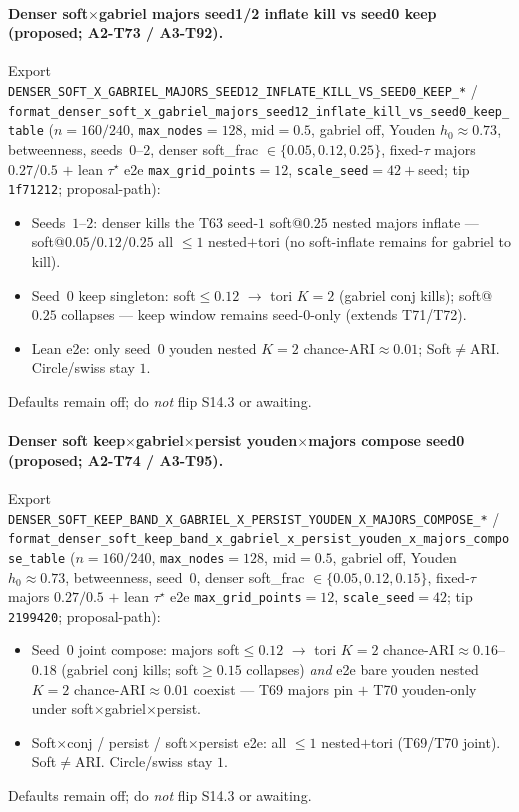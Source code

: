 \documentclass[11pt]{article}
\begin{document}
\paragraph{Denser soft$\times$gabriel majors seed1/2 inflate kill vs seed0
keep (proposed; A2-T73 / A3-T92).}
Export
\texttt{DENSER\_SOFT\_X\_GABRIEL\_MAJORS\_SEED12\_INFLATE\_KILL\_VS\_SEED0\_KEEP\_*} /
\texttt{format\_denser\_soft\_x\_gabriel\_majors\_seed12\_inflate\_kill\_vs\_seed0\_keep\_table}
($n{=}160/240$, \texttt{max\_nodes}${=}128$, mid${=}0.5$, gabriel off,
Youden $h_0\approx 0.73$, betweenness, seeds~$0$--$2$, denser soft\_frac
$\in\{0.05,0.12,0.25\}$, fixed-$\tau$ majors $0.27/0.5$ $+$ lean $\tau^\star$
e2e \texttt{max\_grid\_points}${=}12$, \texttt{scale\_seed}${=}42{+}$seed;
tip \texttt{1f71212}; proposal-path):
\begin{itemize}[leftmargin=1.5em]
  \item Seeds~$1$--$2$: denser kills the T63 seed-$1$ soft@$0.25$ nested
  majors inflate --- soft@$0.05/0.12/0.25$ all $\le 1$ nested$+$tori (no
  soft-inflate remains for gabriel to kill).
  \item Seed~$0$ keep singleton: soft$\le 0.12$ $\to$ tori $K{=}2$
  (gabriel conj kills); soft@$0.25$ collapses --- keep window remains
  seed-$0$-only (extends T71/T72).
  \item Lean e2e: only seed~$0$ youden nested $K{=}2$ chance-ARI$\approx 0.01$;
  Soft$\neq$ARI. Circle/swiss stay $1$.
\end{itemize}
Defaults remain off; do \emph{not} flip S14.3 or awaiting.

\paragraph{Denser soft keep$\times$gabriel$\times$persist youden$\times$majors
compose seed0 (proposed; A2-T74 / A3-T95).}
Export
\texttt{DENSER\_SOFT\_KEEP\_BAND\_X\_GABRIEL\_X\_PERSIST\_YOUDEN\_X\_MAJORS\_COMPOSE\_*} /
\texttt{format\_denser\_soft\_keep\_band\_x\_gabriel\_x\_persist\_youden\_x\_majors\_compose\_table}
($n{=}160/240$, \texttt{max\_nodes}${=}128$, mid${=}0.5$, gabriel off,
Youden $h_0\approx 0.73$, betweenness, seed~$0$, denser soft\_frac
$\in\{0.05,0.12,0.15\}$, fixed-$\tau$ majors $0.27/0.5$ $+$ lean $\tau^\star$
e2e \texttt{max\_grid\_points}${=}12$, \texttt{scale\_seed}${=}42$; tip
\texttt{2199420}; proposal-path):
\begin{itemize}[leftmargin=1.5em]
  \item Seed~$0$ joint compose: majors soft$\le 0.12$ $\to$ tori $K{=}2$
  chance-ARI$\approx 0.16$--$0.18$ (gabriel conj kills; soft$\ge 0.15$
  collapses) \emph{and} e2e bare youden nested $K{=}2$
  chance-ARI$\approx 0.01$ coexist --- T69 majors pin $+$ T70 youden-only
  under soft$\times$gabriel$\times$persist.
  \item Soft$\times$conj / persist / soft$\times$persist e2e: all $\le 1$
  nested$+$tori (T69/T70 joint). Soft$\neq$ARI. Circle/swiss stay $1$.
\end{itemize}
Defaults remain off; do \emph{not} flip S14.3 or awaiting.
\end{document}
